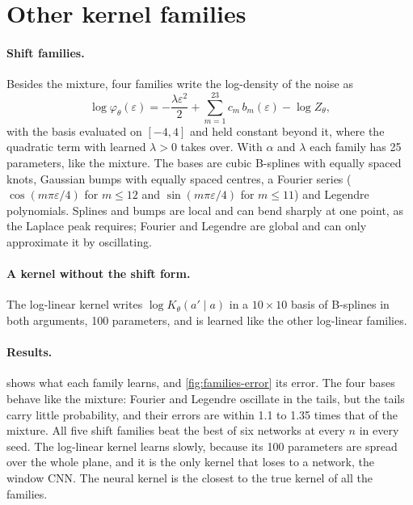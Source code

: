 \documentclass{article}
\begin{document}
\section{Other kernel families}
\label{app:families}

\paragraph{Shift families.} Besides the mixture, four families write the log-density of the noise as
\begin{equation}
  \log\varphi_\theta(\varepsilon)=-\frac{\lambda\varepsilon^2}{2}+\sum_{m=1}^{23}c_m\,b_m(\varepsilon)-\log Z_\theta,
\end{equation}
with the basis evaluated on $[-4,4]$ and held constant beyond it, where the quadratic term with learned $\lambda>0$ takes
over. With $\alpha$ and $\lambda$ each family has 25 parameters, like the mixture. The bases are cubic B-splines with
equally spaced knots, Gaussian bumps with equally spaced centres, a Fourier series ($\cos(m\pi\varepsilon/4)$ for
$m\le12$ and $\sin(m\pi\varepsilon/4)$ for $m\le11$) and Legendre polynomials. Splines and bumps are local and can
bend sharply at one point, as the Laplace peak requires; Fourier and Legendre are global and can only approximate it by
oscillating.

\paragraph{A kernel without the shift form.} The log-linear kernel writes $\log K_\theta(a'\mid a)$ in a $10\times10$
basis of B-splines in both arguments, 100 parameters, and is learned like the other log-linear families.

\paragraph{Results.}  shows what each family learns, and \cref{fig:families-error} its error. The
four bases behave like the mixture: Fourier and Legendre oscillate in the tails, but the tails carry little
probability, and their errors are within 1.1 to 1.35 times that of the mixture. All five shift families beat the best
of six networks at every $n$ in every seed. The log-linear kernel learns slowly, because its 100 parameters are spread
over the whole plane, and it is the only kernel that loses to a network, the window CNN. The neural kernel is the
closest to the true kernel of all the families.
\end{document}
